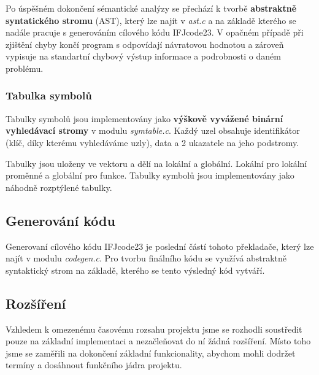 \documentclass[a4paper, 12pt]{article} %
\begin{document}
            Po úspěšném dokončení sémantické 
            analýzy se přechází k tvorbě \textbf{abstraktně syntatického stromu} (AST), který lze najít v 
            \textit{ast.c} a na základě kterého se nadále pracuje s generováním cílového kódu IFJcode23. 
            V opačném případě při zjištění chyby končí program s odpovídají návratovou hodnotou a 
            zároveň vypisuje na standartní chybový výstup informace a podrobnosti o daném problému.


            \subsubsection{Tabulka symbolů}
                Tabulky symbolů jsou implementovány jako \textbf{výškově vyvážené binární vyhledávací stromy}
                v modulu \textit{symtable.c}. Každý uzel obsahuje identifikátor (klíč, díky kterému 
                vyhledáváme uzly), data a 2 ukazatele na jeho podstromy.
                
                Tabulky jsou uloženy ve vektoru a dělí na lokální a globální. Lokální pro lokální 
                proměnné a globální pro funkce. Tabulky symbolů jsou implementovány jako 
                náhodně rozptýlené tabulky.

        \subsection{Generování kódu} \label{codegen}
            Generovaní cílového kódu IFJcode23 je poslední částí tohoto překladače, který lze najít 
            v modulu \textit{codegen.c}. Pro tvorbu finálního kódu se využívá abstraktně syntaktický strom
            na základě, kterého se tento výsledný kód vytváří. 

        \subsection{Rozšíření}
            Vzhledem k omezenému časovému rozsahu projektu jsme se rozhodli soustředit pouze na 
            základní implementaci a nezačleňovat do ní žádná rozšíření. Místo toho jsme se zaměřili 
            na dokončení základní funkcionality, abychom mohli dodržet termíny a dosáhnout funkčního 
            jádra projektu.
    
\end{document}
